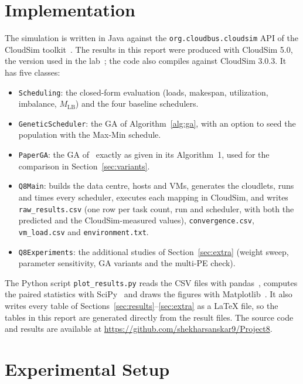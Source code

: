\documentclass[journal,onecolumn,12pt]{IEEEtran}
\newcommand{\MLB}{M_{\mathrm{LB}}}
\begin{document}
\section{Implementation}\label{sec:impl}

The simulation is written in Java against the \texttt{org.cloudbus.cloudsim} API of the CloudSim toolkit~\cite{cloudsim}. The results in this report were produced with CloudSim 5.0, the version used in the lab~\cite{panda}; the code also compiles against CloudSim 3.0.3. It has five classes:
\begin{itemize}
\item \texttt{Scheduling}: the closed-form evaluation (loads, makespan, utilization, imbalance, $\MLB$) and the four baseline schedulers.
\item \texttt{GeneticScheduler}: the GA of Algorithm~\ref{alg:ga}, with an option to seed the population with the Max-Min schedule.
\item \texttt{PaperGA}: the GA of~\cite{dehury} exactly as given in its Algorithm~1, used for the comparison in Section~\ref{sec:variants}.
\item \texttt{Q8Main}: builds the data centre, hosts and VMs, generates the cloudlets, runs and times every scheduler, executes each mapping in CloudSim, and writes \texttt{raw\_results.csv} (one row per task count, run and scheduler, with both the predicted and the CloudSim-measured values), \texttt{convergence.csv}, \texttt{vm\_load.csv} and \texttt{environment.txt}.
\item \texttt{Q8Experiments}: the additional studies of Section~\ref{sec:extra} (weight sweep, parameter sensitivity, GA variants and the multi-PE check).
\end{itemize}
The Python script \texttt{plot\_results.py} reads the CSV files with pandas~\cite{pandas}, computes the paired statistics with SciPy~\cite{scipy} and draws the figures with Matplotlib~\cite{matplotlib}. It also writes every table of Sections~\ref{sec:results}--\ref{sec:extra} as a LaTeX file, so the tables in this report are generated directly from the result files. The source code and results are available at \url{https://github.com/shekharsanskar9/Project8}.

\section{Experimental Setup}\label{sec:setup}
\end{document}
